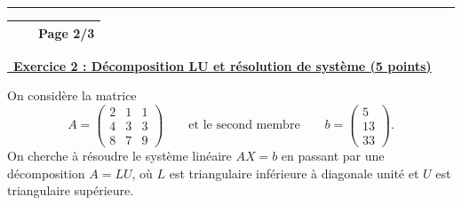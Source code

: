 \hfill\break
\hrule
\hfill\break

\newpage

\begin{center}
    \renewcommand{\arraystretch}{1.5}
    \begin{tabular}{|>{\centering\arraybackslash}m{4cm}|>{\centering\arraybackslash}m{6cm}|>{\centering\arraybackslash}m{4cm}|}
        \hline
            \hspace{4cm}&\hspace{6cm} & \textbf{Page 2/3}\\
            \hline
    \end{tabular}
\end{center}

\underline{\, \bf{Exercice 2 : Décomposition LU et résolution de système} \bf{(5 points)}}
\medskip

On considère la matrice
\[
A=
\begin{pmatrix}
2 & 1 & 1\\
4 & 3 & 3\\
8 & 7 & 9
\end{pmatrix}
\qquad \text{et le second membre} \qquad
b=
\begin{pmatrix}
5\\13\\33
\end{pmatrix}.
\]
On cherche à résoudre le système linéaire $A X = b$ en passant par une décomposition $A = L U$, où $L$ est triangulaire inférieure à diagonale unité et $U$ est triangulaire supérieure.

